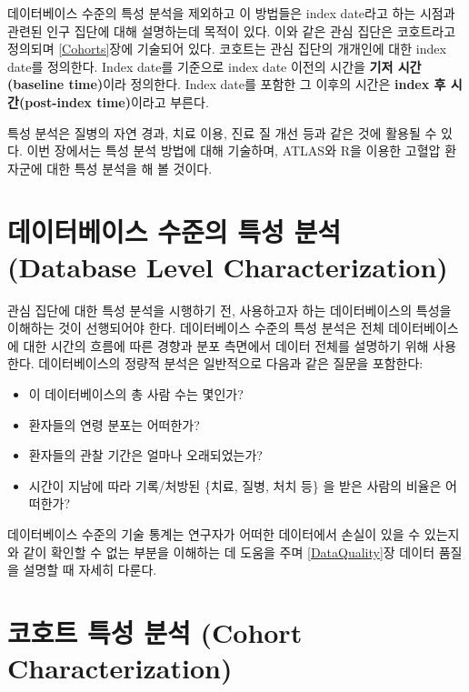 \documentclass[11pt]{book}
\providecommand{\tightlist}{%
  \setlength{\itemsep}{0pt}\setlength{\parskip}{0pt}}
\theoremstyle{definition}
\theoremstyle{definition}
\theoremstyle{definition}
\theoremstyle{remark}
\begin{document}
데이터베이스 수준의 특성 분석을 제외하고 이 방법들은 index date라고 하는
시점과 관련된 인구 집단에 대해 설명하는데 목적이 있다. 이와 같은 관심
집단은 코호트라고 정의되며 \ref{Cohorts}장에 기술되어 있다. 코호트는
관심 집단의 개개인에 대한 index date를 정의한다. Index date를 기준으로
index date 이전의 시간을 \textbf{기저 시간(baseline time)}이라 정의한다.
Index date를 포함한 그 이후의 시간은 \textbf{index 후 시간(post-index
time)}이라고 부른다.

특성 분석은 질병의 자연 경과, 치료 이용, 진료 질 개선 등과 같은 것에
활용될 수 있다. 이번 장에서는 특성 분석 방법에 대해 기술하며, ATLAS와
R을 이용한 고혈압 환자군에 대한 특성 분석을 해 볼
것이다.
  

\section{데이터베이스 수준의 특성 분석 (Database Level
Characterization)}\label{----database-level-characterization}

관심 집단에 대한 특성 분석을 시행하기 전, 사용하고자 하는 데이터베이스의
특성을 이해하는 것이 선행되어야 한다. 데이터베이스 수준의 특성 분석은
전체 데이터베이스에 대한 시간의 흐름에 따른 경향과 분포 측면에서 데이터
전체를 설명하기 위해 사용한다. 데이터베이스의 정량적 분석은 일반적으로
다음과 같은 질문을 포함한다:

\begin{itemize}
\tightlist
\item
  이 데이터베이스의 총 사람 수는 몇인가?
\item
  환자들의 연령 분포는 어떠한가?
\item
  환자들의 관찰 기간은 얼마나 오래되었는가?
\item
  시간이 지남에 따라 기록/처방된 \{치료, 질병, 처치 등\} 을 받은 사람의
  비율은 어떠한가?
\end{itemize}

데이터베이스 수준의 기술 통계는 연구자가 어떠한 데이터에서 손실이 있을
수 있는지와 같이 확인할 수 없는 부분을 이해하는 데 도움을 주며
\ref{DataQuality}장 데이터 품질을 설명할 때 자세히 다룬다.

\section{코호트 특성 분석 (Cohort
Characterization)}\label{---cohort-characterization}
\end{document}
